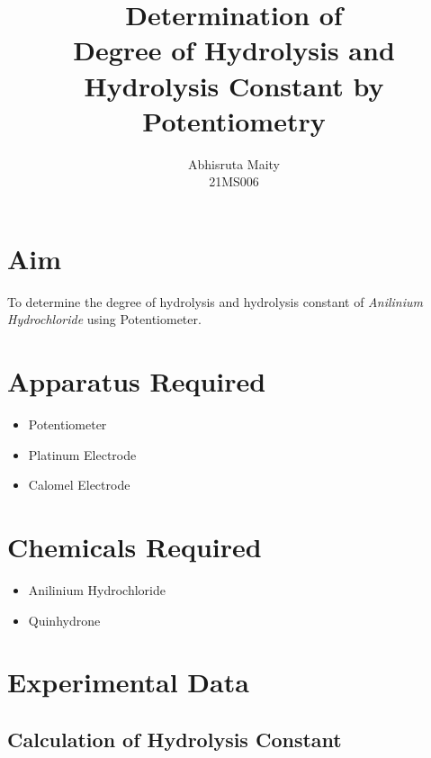 \documentclass[11pt, a4paper, abstract=true]{scrartcl}
\begin{document}
\subject{
    CH1202: Lab Report II
}
\title{
    \huge Determination of \\
Degree of Hydrolysis and \\ Hydrolysis Constant by Potentiometry
}
\author{
    Abhisruta Maity \\
    {\normalsize 21MS006}
}
\date{}
\publishers{
    \normalsize \emph{Indian Institute of Science Education and Research, Kolkata \\
    Mohanpur, West Bengal, 741246, India}
}
\maketitle

\tableofcontents

\section{Aim}

To determine the degree of hydrolysis and hydrolysis constant of \emph{Anilinium Hydrochloride} using Potentiometer.

\section{Apparatus Required}

\begin{itemize}
    \item Potentiometer
    \item Platinum Electrode
    \item Calomel Electrode
\end{itemize}

\section{Chemicals Required}

\begin{itemize}
    \item Anilinium Hydrochloride
    \item Quinhydrone
\end{itemize}

\section{Experimental Data}

\subsection*{Calculation of Hydrolysis Constant}
\end{document}
